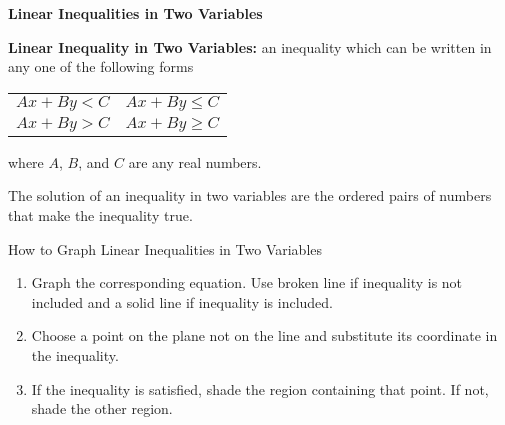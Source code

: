 \begin{center}
\textbf{Linear Inequalities in Two Variables}
\end{center}

\vspace*{1ex}

\textbf{Linear Inequality in Two Variables:} an inequality which can be written in any one of the following forms 

\begin{center}
\noindent\begin{minipage}{\textwidth}
\begin{tabularx}{\textwidth}{YY}
$Ax+By<C$ & $Ax+By \leq C$ \\
$Ax+By>C$ & $Ax+By \geq C$ \\
\end{tabularx} 
\end{minipage}
\end{center} 

where $A$, $B$,  and $C$ are any real numbers. 

\vspce 

The solution of an inequality in two variables are the ordered pairs of numbers that make the inequality true. 

\vspce 

How to Graph Linear Inequalities in Two Variables

\begin{enumerate}[label = \arabic*. ]
\item Graph the corresponding equation. Use broken line if inequality is not included and a
solid line if inequality is included.
\item Choose a point on the plane not on the line and substitute its coordinate in the inequality.
\item If the inequality is satisfied, shade the region containing that point. If not, shade the other region.

\end{enumerate}  